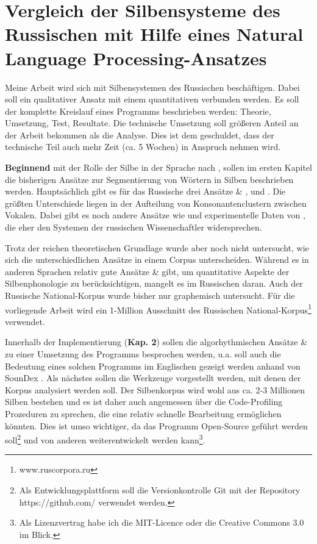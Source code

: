 \documentclass[a4paper]{scrartcl}
\newcommand\autocite[1]{\cite[]{#1}}
\begin{document}
\section*{Vergleich der Silbensysteme des Russischen mit Hilfe eines Natural Language Processing-Ansatzes}

Meine Arbeit wird sich mit Silbensystemen des Russischen beschäftigen. Dabei soll ein qualitativer Ansatz mit einem quantitativen verbunden werden. Es soll der komplette Kreislauf eines Programms beschrieben werden: Theorie, Umsetzung, Test, Resultate. Die technische Umsetzung soll grö\ss eren Anteil an der Arbeit bekommen als die Analyse. Dies ist dem geschuldet, dass der technische Teil auch mehr Zeit (ca. 5 Wochen) in Anspruch nehmen wird.  \citep{bird2009}
   
\textbf{Beginnend} mit der Rolle der Silbe in der Sprache nach \citet{cholin2011}, sollen im ersten Kapitel die bisherigen Ansätze zur Segmentierung von Wörtern in Silben beschrieben werden. Hauptsächlich gibt es für das Russische drei Ansätze \cite{scherba1983} \& \cite{vino1953}, \cite{kasatkin2001} und \cite{bondarko1998}. Die größten Unterschiede liegen in der Aufteilung von Konsonantenclustern zwischen Vokalen. Dabei gibt es noch andere Ansätze wie \cite{deterding2001} und experimentelle Daten von \cite{cote2011}, die eher den Systemen der russischen Wissenschaftler widersprechen.

Trotz der reichen theoretischen Grundlage wurde aber noch nicht untersucht, wie sich die unterschiedlichen Ansätze in einem Corpus unterscheiden. Während es in anderen Sprachen relativ gute Ansätze \cite{padro2012} \& \cite{iaco2011} gibt, um quantitative Aspekte der Silbenphonologie zu berücksichtigen, mangelt es im Russischen daran. Auch der Russische National-Korpus wurde bisher nur graphemisch untersucht. Für die vorliegende Arbeit wird ein 1-Million Ausschnitt des Russischen National-Korpus\footnote{www.ruscorpora.ru} verwendet.

Innerhalb der Implementierung (\textbf{Kap. 2}) sollen die algorhythmischen Ansätze \cite{oakes1998} \& \autocite{jurafsky2008} zu einer Umsetzung des Programms besprochen werden, u.a. soll auch die Bedeutung eines solchen Programms im Englischen gezeigt werden anhand von SounDex \citep{bird2009}. Als nächstes sollen die Werkzeuge vorgestellt werden, mit denen der Korpus analysiert werden soll. Der Silbenkorpus wird wohl aus ca. 2-3 Millionen Silben bestehen und es ist daher auch angemessen über die Code-Profiling Prozeduren \cite{mckinney2012} zu sprechen, die eine relativ schnelle Bearbeitung ermöglichen könnten. Dies ist umso wichtiger, da das Programm Open-Source geführt werden soll\footnote{Als Entwicklungsplattform soll die Versionkontrolle Git mit der Repository https://github.com/ verwendet werden.} und von anderen weiterentwickelt werden kann\footnote{Als Lizenzvertrag habe ich die MIT-Licence oder die Creative Commons 3.0 im Blick.}.
\end{document}
